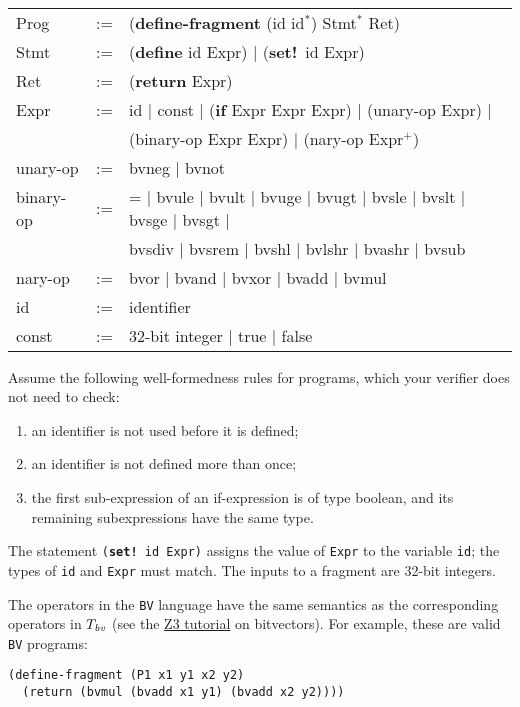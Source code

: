 \documentclass{handout}
\begin{document}
{\tt\small
\begin{tabular}{lcl}
Prog &:=&  (\textbf{define-fragment} (id id$^\mathtt{*}$) Stmt$^\mathtt{*}$ Ret) \\
Stmt &:=& (\textbf{define} id Expr) $|$ (\textbf{set!}\ id Expr) \\
Ret &:=& (\textbf{return} Expr) \\
Expr &:=& id $|$ const $|$ (\textbf{if} Expr Expr Expr) $|$ (unary-op Expr) $|$ \\
         &&(binary-op Expr Expr) $|$ (nary-op Expr$^\mathtt{+}$)\\
unary-op &:=& bvneg $|$ bvnot \\
binary-op &:=& = $|$ bvule $|$ bvult $|$ bvuge $|$ bvugt $|$ bvsle $|$ bvslt  $|$ bvsge $|$ bvsgt $|$  \\
                && bvsdiv $|$ bvsrem $|$ bvshl $|$ bvlshr $|$ bvashr $|$ bvsub\\
nary-op &:=& bvor $|$ bvand $|$ bvxor $|$  bvadd $|$  bvmul\\
id &:=& identifier\\
const &:=& 32-bit integer $|$ true $|$ false\\
\end{tabular}}

Assume the following well-formedness rules for programs, which your verifier
does not need to check:  
\begin{enumerate}
\item an identifier is not used before it is defined; 
\item an identifier is not defined more than once;  
\item the first sub-expression of an if-expression is of type boolean, and its remaining subexpressions have the same type.  
\end{enumerate}
The statement \texttt{(\textbf{set!}\ id Expr)}  assigns the value of
\texttt{Expr} to the variable \texttt{id}; the types of \texttt{id} and
\texttt{Expr} must match.  The inputs to a fragment are 32-bit integers.

The operators in the \texttt{BV} language have the same semantics as the
corresponding operators in $T_\emph{bv}$ (see the
\href{http://rise4fun.com/z3/tutorial}{Z3 tutorial} on bitvectors). For example,
these are valid \texttt{BV} programs:

\lstset{language=lisp}
\begin{lstlisting}
(define-fragment (P1 x1 y1 x2 y2)
  (return (bvmul (bvadd x1 y1) (bvadd x2 y2))))
\end{lstlisting}
\end{document}
